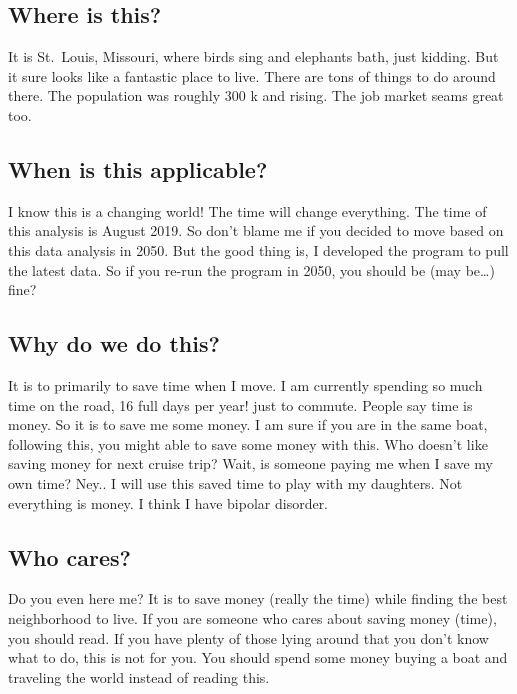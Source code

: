 \documentclass[11pt]{article}
\begin{document}
\hypertarget{where-is-this}{%
\subsection{Where is this?}\label{where-is-this}}

It is St.~Louis, Missouri, where birds sing and elephants bath, just
kidding. But it sure looks like a fantastic place to live. There are
tons of things to do around there. The population was roughly 300 k and
rising. The job market seams great too.

\hypertarget{when-is-this-applicable}{%
\subsection{When is this applicable?}\label{when-is-this-applicable}}

I know this is a changing world! The time will change everything. The
time of this analysis is August 2019. So don't blame me if you decided
to move based on this data analysis in 2050. But the good thing is, I
developed the program to pull the latest data. So if you re-run the
program in 2050, you should be (may be\ldots{}) fine?

\hypertarget{why-do-we-do-this}{%
\subsection{Why do we do this?}\label{why-do-we-do-this}}

It is to primarily to save time when I move. I am currently spending so
much time on the road, 16 full days per year! just to commute. People
say time is money. So it is to save me some money. I am sure if you are
in the same boat, following this, you might able to save some money with
this. Who doesn't like saving money for next cruise trip? Wait, is
someone paying me when I save my own time? Ney.. I will use this saved
time to play with my daughters. Not everything is money. I think I have
bipolar disorder.

\hypertarget{who-cares}{%
\subsection{Who cares?}\label{who-cares}}

Do you even here me? It is to save money (really the time) while finding
the best neighborhood to live. If you are someone who cares about saving
money (time), you should read. If you have plenty of those lying around
that you don't know what to do, this is not for you. You should spend
some money buying a boat and traveling the world instead of reading
this.
\end{document}
